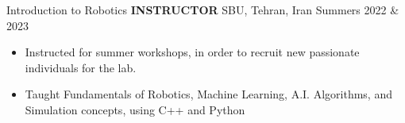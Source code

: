 \begin{cventries}
    \cventry
    {Introduction to Robotics}
    {\textbf{INSTRUCTOR}}
    {SBU, Tehran, Iran}
    {Summers 2022 \& 2023}
    {
        \begin{itemize}
            \item Instructed for summer workshops, in order to recruit new passionate individuals for the lab.
            \item Taught Fundamentals of Robotics, Machine Learning, A.I. Algorithms, and Simulation concepts, using C++ and Python
        \end{itemize}
    }
    \vspace{0.4 cm}
\end{cventries}

